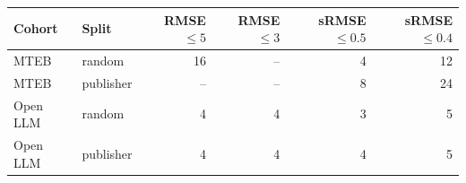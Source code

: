 \begin{tabular}{llrrrr}
\toprule Cohort & Split & RMSE $\leq5$ & RMSE $\leq3$ & sRMSE $\leq0.5$ & sRMSE $\leq0.4$\\\midrule
MTEB & random & 16 & -- & 4 & 12\\
MTEB & publisher & -- & -- & 8 & 24\\
Open LLM & random & 4 & 4 & 3 & 5\\
Open LLM & publisher & 4 & 4 & 4 & 5\\
\bottomrule\end{tabular}